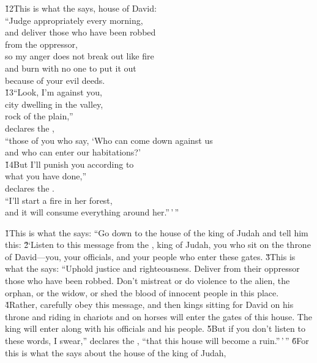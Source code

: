 \begin{poetry}
\poeml \v{12}This is what the  says, house of David: \\
\poeml ``Judge appropriately every morning, \\
\poemll    and deliver those who have been robbed \\
\poemlll       from the oppressor, \\
\poeml so my anger does not break out like fire \\
\poemll    and burn with no one to put it out \\
\poemlll       because of your evil deeds. \\
\poeml \v{13}``Look, I'm against you, \\
\poemll    city dwelling in the valley, \\
\poeml rock of the plain,'' \\
\poemll    declares the , \\
\poeml ``those of you who say, `Who can come down against us \\
\poemll    and who can enter our habitations?' \\
\poeml \v{14}But I'll punish you according to \\
\poemll    what you have done,'' \\
\poemlll       declares the . \\
\poeml ``I'll start a fire in her forest, \\
\poemll    and it will consume everything around her.''\,'\,''
\end{poetry}

\v{1}This is what the  says: ``Go down to the house of the king of Judah and tell him this: \v{2}`Listen to this message from the , king of Judah, you who sit on the throne of David---you, your officials, and your people who enter these gates. \v{3}This is what the  says: ``Uphold justice and righteousness. Deliver from their oppressor those who have been robbed. Don't mistreat or do violence to the alien, the orphan, or the widow, or shed the blood of innocent people in this place. \v{4}Rather, carefully obey this message, and then kings sitting for David on his throne and riding in chariots and on horses will enter the gates of this house. The king will enter along with his officials and his people. \v{5}But if you don't listen to these words, I swear,'' declares the , ``that this house will become a ruin.''\,'\,'' \v{6}For this is what the  says about the house of the king of Judah,

